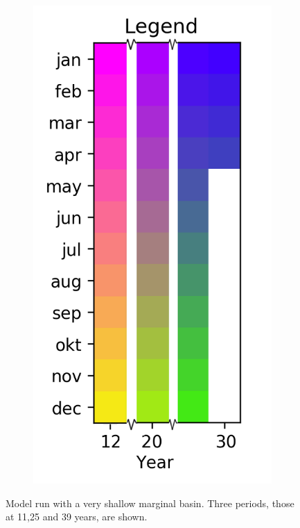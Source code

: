 \documentclass[twocolumn]{article}
\begin{document}
\begin{figure}
\begin{subfigure}[h]{0.20\textwidth}
\includegraphics[width=\linewidth,keepaspectratio]{12-30_reduced_legend.png}
\end{subfigure}\hfill
\caption{Model run with a very shallow marginal basin. Three periods, those at 11,25 and 39 years, are shown.}
\label{fig:Very_shallow_basin}
\end{figure}
\end{document}
